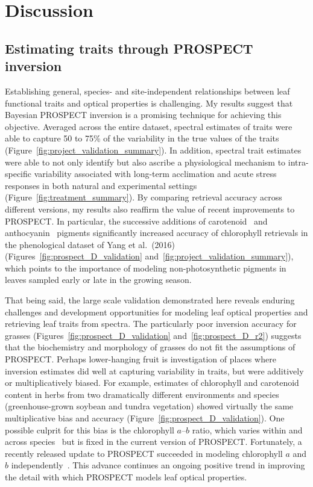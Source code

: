 \section{Discussion}

\subsection{Estimating traits through PROSPECT inversion}

Establishing general, species- and site-independent relationships between leaf functional traits and optical properties is challenging.
My results suggest that Bayesian PROSPECT inversion is a promising technique for achieving this objective.
Averaged across the entire dataset, spectral estimates of traits were able to capture 50 to 75\% of the variability in the true values of the traits (Figure~\ref{fig:project_validation_summary}).
In addition, spectral trait estimates were able to not only identify but also ascribe a physiological mechanism to intra-specific variability associated with long-term acclimation and acute stress responses in both natural and experimental settings (Figure~\ref{fig:treatment_summary}).
By comparing retrieval accuracy across different versions, my results also reaffirm the value of recent improvements to PROSPECT\@.
In particular, the successive additions of carotenoid~\cite{feret_2008_prospect} and anthocyanin~\cite{feret_2017_prospectd} pigments significantly increased accuracy of chlorophyll retrievals in the phenological dataset of Yang et al.~(2016) (Figures~\ref{fig:prospect_D_validation} and~\ref{fig:project_validation_summary}), which points to the importance of modeling non-photosynthetic pigments in leaves sampled early or late in the growing season.   %

That being said, the large scale validation demonstrated here reveals enduring challenges and development opportunities for modeling leaf optical properties and retrieving leaf traits from spectra.
The particularly poor inversion accuracy for grasses (Figures~\ref{fig:prospect_D_validation} and~\ref{fig:prospect_D_r2}) suggests that the biochemistry and morphology of grasses do not fit the assumptions of PROSPECT\@.
Perhaps lower-hanging fruit is investigation of places where inversion estimates did well at capturing variability in traits, but were additively or multiplicatively biased.
For example, estimates of chlorophyll and carotenoid content in herbs from two dramatically different environments and species (greenhouse-grown soybean and tundra vegetation) showed virtually the same multiplicative bias and accuracy (Figure~\ref{fig:prospect_D_validation}).
One possible culprit for this bias is the chlorophyll $a$--$b$ ratio, which varies within and across species~\cite{kurahotta_1987_relationship,kitajima_2003_increases} but is fixed in the current version of PROSPECT\@.
Fortunately, a recently released update to PROSPECT succeeded in modeling chlorophyll $a$ and $b$ independently~\cite{zhang_2017_extended}.
This advance continues an ongoing positive trend in improving the detail with which PROSPECT models leaf optical properties.
 
